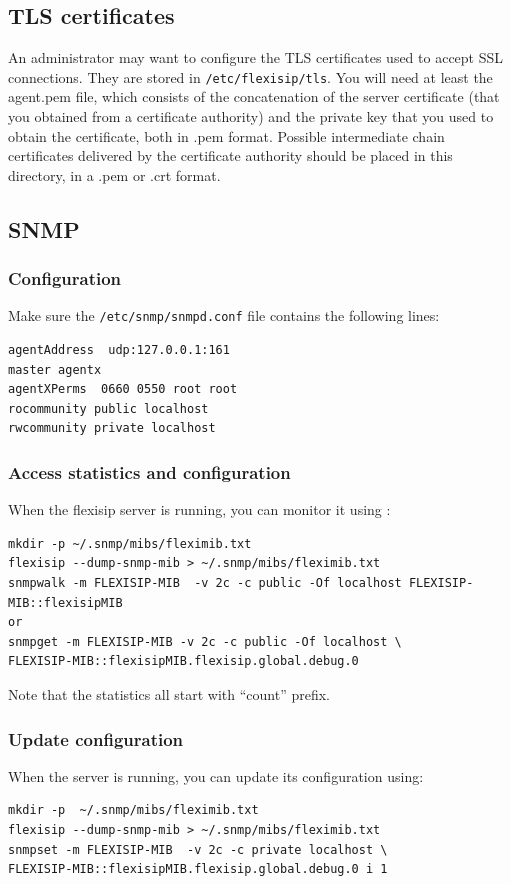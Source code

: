 \documentclass[a4paper,10pt]{article}
\begin{document}
\subsection{TLS certificates}
An administrator may want to configure the TLS certificates used to accept SSL connections.
They are stored in \verb|/etc/flexisip/tls|. You will need at least the agent.pem file, which consists of the concatenation of the server certificate
(that you obtained from a certificate authority) and the private key that you used to obtain the certificate, both in .pem format. Possible intermediate chain certificates delivered by the certificate authority should be placed in this directory, in a .pem or .crt format.

\subsection{SNMP}
\subsubsection{Configuration}
Make sure the \verb|/etc/snmp/snmpd.conf| file contains the following lines:
\begin{verbatim}
agentAddress  udp:127.0.0.1:161
master agentx
agentXPerms  0660 0550 root root
rocommunity public localhost
rwcommunity private localhost
\end{verbatim}




\subsubsection{Access statistics and configuration}
When the flexisip server is running, you can monitor it using :
\begin{verbatim}
mkdir -p ~/.snmp/mibs/fleximib.txt
flexisip --dump-snmp-mib > ~/.snmp/mibs/fleximib.txt
snmpwalk -m FLEXISIP-MIB  -v 2c -c public -Of localhost FLEXISIP-MIB::flexisipMIB
or
snmpget -m FLEXISIP-MIB -v 2c -c public -Of localhost \
FLEXISIP-MIB::flexisipMIB.flexisip.global.debug.0
\end{verbatim}

Note that the statistics all start with “count” prefix.


\subsubsection{Update configuration}
When the server is running, you can update its configuration using:
\begin{verbatim}
mkdir -p  ~/.snmp/mibs/fleximib.txt
flexisip --dump-snmp-mib > ~/.snmp/mibs/fleximib.txt
snmpset -m FLEXISIP-MIB  -v 2c -c private localhost \
FLEXISIP-MIB::flexisipMIB.flexisip.global.debug.0 i 1
\end{verbatim}
\end{document}
